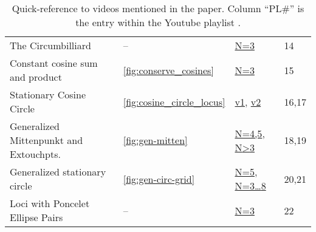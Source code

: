 \begin{table}[H]
\begin{tabular}{llll}
{The Circumbilliard} &
-- &
\href{https://youtu.be/vSCnorIJ2X8}{N=3} &
{14} \\

{Constant cosine sum and product} &
\ref{fig:conserve_cosines} &
\href{https://youtu.be/P8ykpE_ZbZ8}{N=3} &
{15} \\

{Stationary Cosine Circle} &
\ref{fig:cosine_circle_locus} &
\href{https://youtu.be/CrOSI8d8qDc}{v1},{ }
\href{https://youtu.be/hCQIT6_XhaQ}{v2} & 
{16,17} \\

{Generalized Mittenpunkt and Extouchpts.} &
\ref{fig:gen-mitten} &
\href{https://youtu.be/Bpc-MrR2IMc}{N=4,5},{ }
\href{https://youtu.be/TV2p7fPlYfE}{N{\textgreater}3} &
{18,19} \\

{Generalized stationary circle} &
\ref{fig:gen-circ-grid} &
\href{https://youtu.be/dINE4aH1cvk}{N=5},{ } \href{https://youtu.be/EFeINGIDFrg}{N=3\ldots{8}} &
{20,21} \\

{Loci with Poncelet Ellipse Pairs} &
-- &
\href{https://youtu.be/B5dRXT8Xerw}{N=3} &
{22}
\end{tabular}
\caption{Quick-reference to videos mentioned in the paper. Column ``PL\#'' is the entry within the Youtube playlist \cite{dsr_math_intell_playlist}.}
\label{tab:playlist}
\end{table}
